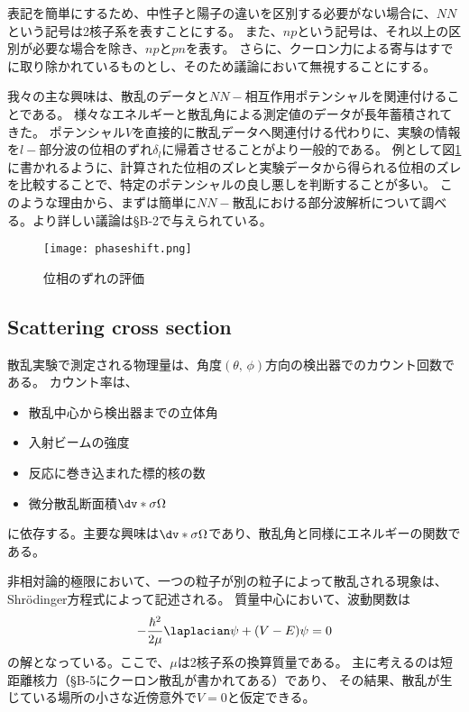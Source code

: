 \documentclass[a4paper,11pt,uplatex]{jsarticle}
\begin{document}
表記を簡単にするため、中性子と陽子の違いを区別する必要がない場合に、$NN$という記号は2核子系を表すことにする。
また、$np$という記号は、それ以上の区別が必要な場合を除き、$np$と$pn$を表す。
さらに、クーロン力による寄与はすでに取り除かれているものとし、そのため議論において無視することにする。

我々の主な興味は、散乱のデータと$NN-$相互作用ポテンシャルを関連付けることである。
様々なエネルギーと散乱角による測定値のデータが長年蓄積されてきた。
ポテンシャル$V$を直接的に散乱データへ関連付ける代わりに、実験の情報を$l-$部分波の位相のずれ$\delta_l$に帰着させることがより一般的である。
例として図\ref{fig:3-3}に書かれるように、計算された位相のズレと実験データから得られる位相のズレを比較することで、特定のポテンシャルの良し悪しを判断することが多い。
このような理由から、まずは簡単に$NN-$散乱における部分波解析について調べる。より詳しい議論は\S{B-2}で与えられている。
\begin{figure}[H]
  \centering
  \texttt{[image: phaseshift.png]}
  \caption{位相のずれの評価}
  \label{fig:3-3}
\end{figure}

\newpage
\subsection*{Scattering cross section}
散乱実験で測定される物理量は、角度$(\theta,\,\phi)$方向の検出器でのカウント回数である。
カウント率は、
\begin{itemize}
  \item 散乱中心から検出器までの立体角
  \item 入射ビームの強度
  \item 反応に巻き込まれた標的核の数
  \item 微分散乱断面積$\dv*{\sigma}{\Omega}$
\end{itemize}
に依存する。主要な興味は$\dv*{\sigma}{\Omega}$であり、散乱角と同様にエネルギーの関数である。

非相対論的極限において、一つの粒子が別の粒子によって散乱される現象は、Shr\"{o}dinger方程式によって記述される。
質量中心において、波動関数は
\begin{equation}
  -\frac{\hbar^2}{2\mu}\laplacian\psi + (V-E)\psi=0
\end{equation}
の解となっている。ここで、$\mu$は2核子系の換算質量である。
主に考えるのは短距離核力（\S{B-5}にクーロン散乱が書かれてある）であり、
その結果、散乱が生じている場所の小さな近傍意外で$V=0$と仮定できる。
\end{document}
